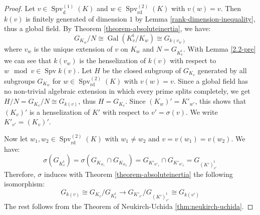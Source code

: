\begin{proof}
Let $v\in\operatorname{Spv}_\text{d}^{(1)}(K)$ and $w\in\operatorname{Spv}_\text{rd}^{(2)}(K)$ with $v(w)=v$. Then $k(v)$ is finitely generated of dimension $1$ by Lemma \ref{rank-dimension-inequality}, thus a global field. By Theorem \ref{theorem-absoluteinertia}, we have: 
\[G_{K_w}/N \cong \operatorname{Gal}(K_v^\text{t}/K_w)\cong G_{k(v_w)}\] 
where $v_w$ is the unique extension of $v$ on $K_w$ and $N=G_{K_v^\text{t}}$. With Lemma \ref{2.2-pre} we can see that $k(v_w)$ is the henselization of $k(v)$ with respect to $w\mod v\in\operatorname{Spv}k(v)$. Let $H$ be the closed subgroup of $G_{K_v}$ generated by all subgroups $G_{K_w}$ for $w\in\operatorname{Spv}_\text{rd}^{(2)}(K)$ with $v(w) = v$. Since a global field has no non-trivial algebraic extension in which every prime splits completely, we get $H/N= G_{K_v}/N\cong G_{k(v)}$, thus $H=G_{K_v}$. Since $(K_w)'=K'_{w'}$, this shows that $(K_v)'$ is a henselization of $K'$ with respect to $v'=\sigma(v)$. We write $K'_{v'} = (K_v)'$. 

Now let $w_1,w_2\in\operatorname{Spv}_\text{rd}^{(2)}(K)$ with $w_1\neq w_2$ and $v=v(w_1)=v(w_2)$. We have:
\[ \sigma(G_{K^\text{t}_v}) = \sigma(G_{K_{w_1}}\cap G_{K_{w_2}}) = G_{K'_{w'_1}}\cap G_{K'_{w'_2}} = G_{(K')^\text{t}_{v'}} \]
Therefore, $\sigma$ induces with Theorem \ref{theorem-absoluteinertia} the following isomorphism:
\[ G_{k(v)} \cong G_{K_v}/G_{K_v^\text{t}} \to G_{K'_{v'}}/G_{(K')_{v'}^\text{t}}\cong G_{k(v')} \]
The rest follows from the Theorem of Neukirch-Uchida \ref{thm:neukirch-uchida}.
\end{proof}

